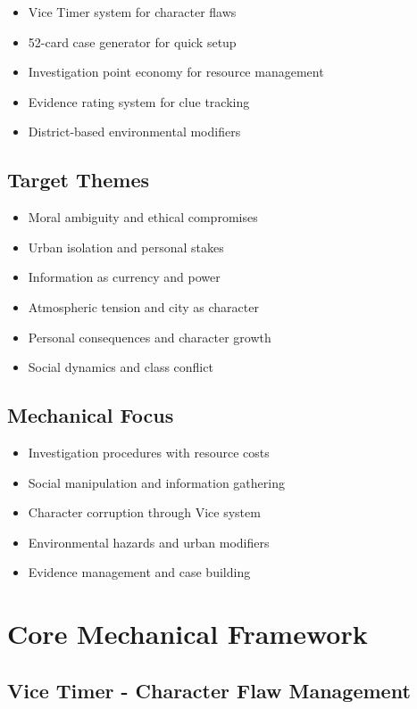 \documentclass[11pt]{article}
\begin{document}
\begin{itemize}
\item Vice Timer system for character flaws
\item 52-card case generator for quick setup
\item Investigation point economy for resource management
\item Evidence rating system for clue tracking
\item District-based environmental modifiers
\end{itemize}

\subsection{Target Themes}

\begin{itemize}
\item Moral ambiguity and ethical compromises
\item Urban isolation and personal stakes
\item Information as currency and power
\item Atmospheric tension and city as character
\item Personal consequences and character growth
\item Social dynamics and class conflict
\end{itemize}

\subsection{Mechanical Focus}

\begin{itemize}
\item Investigation procedures with resource costs
\item Social manipulation and information gathering
\item Character corruption through Vice system
\item Environmental hazards and urban modifiers
\item Evidence management and case building
\end{itemize}

\section{Core Mechanical Framework}

\subsection{Vice Timer - Character Flaw Management}
\end{document}
